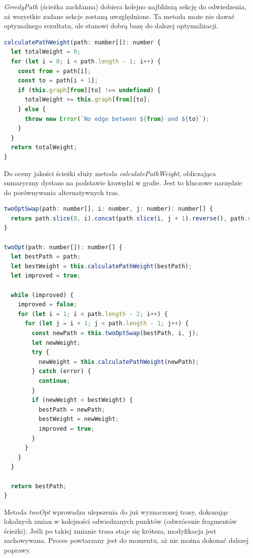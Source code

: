 \textit{GreedyPath} (ścieżka zachłanna) dobiera kolejno najbliższą sekcję do odwiedzenia, aż wszystkie zadane sekcje zostaną uwzględnione. Ta metoda może nie dawać optymalnego rezultatu, ale stanowi dobrą bazę do dalszej optymalizacji.

\begin{lstlisting}[language=JavaScript, caption={Przeliczanie całkowitej wagi (długości) trasy}, label={lst:pathfinding_weight}]
calculatePathWeight(path: number[]): number {
  let totalWeight = 0;
  for (let i = 0; i < path.length - 1; i++) {
    const from = path[i];
    const to = path[i + 1];
    if (this.graph[from][to] !== undefined) {
      totalWeight += this.graph[from][to];
    } else {
      throw new Error(`No edge between ${from} and ${to}`);
    }
  }
  return totalWeight;
}
\end{lstlisting}

Do oceny jakości ścieżki służy metoda \textit{calculatePathWeight}, obliczająca sumaryczny dystans na podstawie krawędzi w grafie. Jest to kluczowe narzędzie do porównywania alternatywnych tras.

\begin{lstlisting}[language=JavaScript, caption={Lokalna optymalizacja ścieżki metodą 2-Opt}, label={lst:pathfinding_twoopt}]
twoOptSwap(path: number[], i: number, j: number): number[] {
  return path.slice(0, i).concat(path.slice(i, j + 1).reverse(), path.slice(j + 1));
}

twoOpt(path: number[]): number[] {
  let bestPath = path;
  let bestWeight = this.calculatePathWeight(bestPath);
  let improved = true;

  while (improved) {
    improved = false;
    for (let i = 1; i < path.length - 2; i++) {
      for (let j = i + 1; j < path.length - 1; j++) {
        const newPath = this.twoOptSwap(bestPath, i, j);
        let newWeight;
        try {
          newWeight = this.calculatePathWeight(newPath);
        } catch (error) {
          continue;
        }
        if (newWeight < bestWeight) {
          bestPath = newPath;
          bestWeight = newWeight;
          improved = true;
        }
      }
    }
  }

  return bestPath;
}
\end{lstlisting}

Metoda \textit{twoOpt} wprowadza ulepszenia do już wyznaczonej trasy, dokonując lokalnych zmian w kolejności odwiedzanych punktów (odwrócenie fragmentów ścieżki). Jeśli po takiej zmianie trasa staje się krótsza, modyfikacja jest zachowywana. Proces powtarzany jest do momentu, aż nie można dokonać dalszej poprawy.

